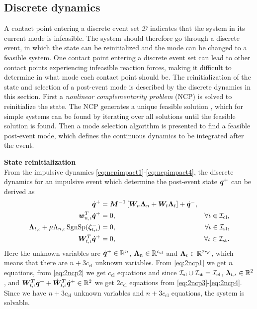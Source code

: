 \documentclass[../DC2017114Bouma.tex]{subfiles}
\begin{document}
\subsection{Discrete dynamics}\label{sec:2discdyn}
A contact point entering a discrete event set $\mathcal{D}$ indicates that the system in its current mode is infeasible. The system should therefore go through a discrete event, in which the state can be reinitialized and the mode can be changed to a feasible system. One contact point entering a discrete event set can lead to other contact points experiencing infeasible reaction forces, making it difficult to determine in what mode each contact point should be. The reinitialization of the state and selection of a post-event mode is described by the discrete dynamics in this section. First a \textit{nonlinear complementarity problem} (NCP) is solved to reinitialize the state. The NCP generates a unique feasible solution \cite{Delassus1917}, which for simple systems can be found by iterating over all solutions until the feasible solution is found. Then a mode selection algorithm is presented to find a feasible post-event mode, which defines the continuous dynamics to be integrated after the event. 
%

\textbf{State reinitialization}\\
From the impulsive dynamics \eqref{eq:ncpimpact1}-\eqref{eq:ncpimpact4}, the discrete dynamics for an impulsive event which determine the post-event state ${\boldsymbol{q}}^+$ can be derived as
\begin{align}
\dot{{\boldsymbol{q}}}^+ &= {\boldsymbol{M}}^{-1}\left[{\boldsymbol{W}}_{n}\boldsymbol{\Lambda}_{n} + {\boldsymbol{W}}_{t}\boldsymbol{\Lambda}_{t}\right] + \dot{{\boldsymbol{q}}}^-, \label{eq:2ncp1}\\
{\boldsymbol{w}}^T_{n,\iota}\dot{{\boldsymbol{q}}}^+ &= 0, &\forall \iota\in\mathcal{I}_{\text{cl}},\label{eq:2ncp2}\\
\boldsymbol{\Lambda}_{t,\iota} + \mu\Lambda_{n,\iota}\operatorname{\text{SgnSp}}(\boldsymbol{\zeta}^-_{t,\iota})&= 0, &\forall \iota\in\mathcal{I}_{\text{sl}},\label{eq:2ncp3}\\
{\boldsymbol{W}}^T_{t,\iota}\dot{{\boldsymbol{q}}}^+ &= 0, &\forall \iota\in\mathcal{I}_{\text{st}}.\label{eq:2ncp4}
\end{align}
Here the unknown variables are $\dot{{\boldsymbol{q}}}^+\in\mathbb{R}^{n}$, $\boldsymbol{\Lambda}_{n}\in\mathbb{R}^{c_{\text{cl}}}$ and $\boldsymbol{\Lambda}_{t}\in\mathbb{R}^{2c_{\text{cl}}}$, which means that there are $n+3c_{\text{cl}}$ unknown variables. From \eqref{eq:2ncp1} we get $n$ equations, from \eqref{eq:2ncp2} we get $c_{\text{cl}}$ equations and since $\mathcal{I}_{\text{sl}}\cup\mathcal{I}_{\text{st}}=\mathcal{I}_{\text{cl}}$, $\boldsymbol{\lambda}_{t,\iota}\in\mathbb{R}^2$, and ${\boldsymbol{W}}^T_{t,\iota}\ddot{{\boldsymbol{q}}}^+ + \dot{{\boldsymbol{W}}}^T_{t,\iota}\dot{{\boldsymbol{q}}}^+ \in\mathbb{R}^2$ we get $2c_{\text{cl}}$ equations from \eqref{eq:2ncp3}-\eqref{eq:2ncp4}. Since we have $n+3c_{\text{cl}}$ unknown variables and $n+3c_{\text{cl}}$ equations, the system is solvable.
\end{document}
